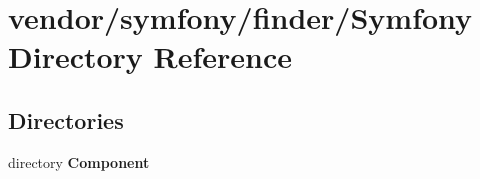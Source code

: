 \section{vendor/symfony/finder/\+Symfony Directory Reference}
\label{dir_3b80a1988ec1b6606614d85ff8944f56}
\subsection*{Directories}
\begin{DoxyCompactItemize}
\item 
directory {\bf Component}
\end{DoxyCompactItemize}
